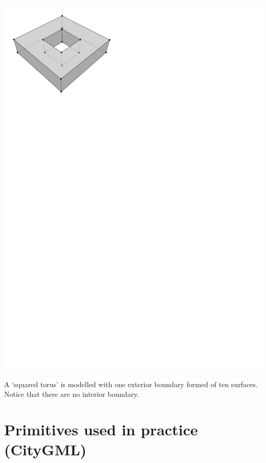 \begin{marginfigure}
  \centering
  \includegraphics[width=0.8\linewidth]{figs/torus.pdf}
  \caption{A `squared torus' is modelled with one exterior boundary formed of ten surfaces. Notice that there are no interior boundary.}%
\label{fig:torus}
\end{marginfigure}


%
\section[Primitives used in practice]{Primitives used in practice (CityGML)}

